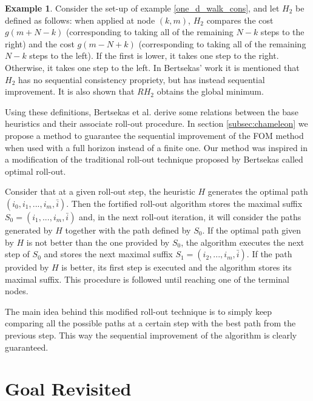 \documentclass[12,twoside]{TFG-GM}
\theoremstyle{definition}
\newtheorem{example}[theorem]{Example}
\theoremstyle{remark}
\newcommand*\diff[1]{\bar{#1}}
\begin{document}
\begin{example}
Consider the set-up of example \ref{one_d_walk_cons}, and let $H_2$ be defined as follows: when applied at node $(k,m)$, $H_2$ compares the cost $g(m + N - k)$ (corresponding to taking all of the remaining $N - k$ steps to the right) and the cost $g(m - N + k)$ (corresponding to taking all of the remaining $N - k$ steps to the left). If the first is lower, it takes one step to the right. Otherwise, it takes one step to the left. In Bertsekas' work it is mentioned that $H_2$ has no sequential consistency propriety, but has instead sequential improvement. It is also shown that $RH_2$ obtains the global minimum.
\end{example}

Using these definitions, Bertsekas et al. derive some relations between the base heuristics and their associate roll-out procedure. In section \ref{subsec:chameleon} we propose a method to guarantee the sequential improvement of the FOM method when used with a full horizon instead of a finite one. Our method was inspired in a modification of the traditional roll-out technique proposed by Bertsekas called optimal roll-out.

Consider that at a given roll-out step, the heuristic $H$ generates the optimal path $(i_0, i_1,..., i_m, \diff{i})$. Then the fortified roll-out algorithm stores the maximal suffix $S_0 = (i_1, ..., i_m, \diff{i})$ and, in the next roll-out iteration, it will consider the paths generated by $H$ together with the path defined by $S_0$. If the optimal path given by $H$ is not better than the one provided by $S_0$, the algorithm executes the next step of $S_0$ and stores the next maximal suffix $S_1 = (i_2, ..., i_m, \diff{i})$. If the path provided by $H$ is better, its first step is executed and the algorithm stores its maximal suffix. This procedure is followed until reaching one of the terminal nodes.

The main idea behind this modified roll-out technique is to simply keep comparing all the possible paths at a certain step with the best path from the previous step. This way the sequential improvement of the algorithm is clearly guaranteed.

\section{Goal Revisited}
\label{sec:goal_revisited}
\end{document}
